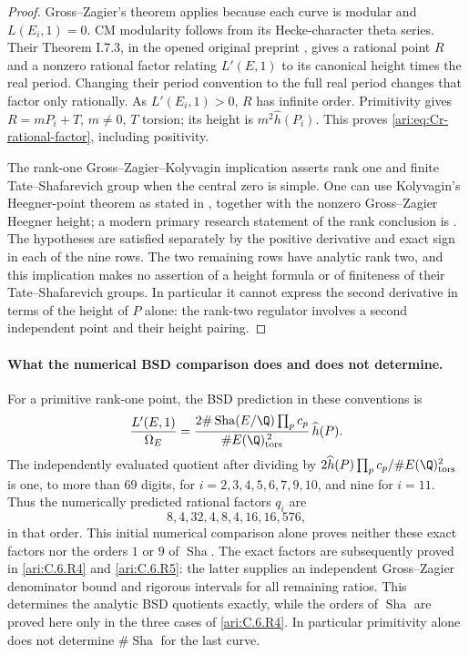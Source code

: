 \begin{proof}
Gross--Zagier's theorem applies because each curve is modular and
$L(E_i,1)=0$. CM modularity follows from its Hecke-character
theta series. Their Theorem I.7.3, in the opened original
preprint \citep{CrGrossZagier1986}, gives a rational point $R$ and
a nonzero rational factor relating $L'(E,1)$ to its canonical
height times the real period. Changing their period convention
to the full real period changes that factor only rationally.
As $L'(E_i,1)>0$, $R$ has infinite order. Primitivity gives
$R=mP_i+T$, $m\ne0$, $T$ torsion; its height is
$m^2\widehat h(P_i)$. This proves
\eqref{ari:eq:Cr-rational-factor}, including positivity.

The rank-one Gross--Zagier--Kolyvagin implication asserts rank one
and finite Tate--Shafarevich group when the central zero is simple.
One can use Kolyvagin's Heegner-point theorem as stated in
\citet[Theorem 1.3]{CrGross1991}, together with the nonzero
Gross--Zagier Heegner height; a modern primary research statement
of the rank conclusion is \citet[Theorem 1.1]{CrJetchev2008}.
The hypotheses are satisfied separately by the positive derivative
and exact sign in each of the nine rows. The two remaining rows
have analytic rank two, and this implication makes no assertion
of a height formula or of finiteness of their Tate--Shafarevich
groups. In particular it cannot express the second derivative
in terms of the height of $P$ alone: the rank-two regulator involves
a second independent point and their height pairing.
\end{proof}

\paragraph{What the numerical BSD comparison does and does not determine.}
For a primitive rank-one point, the BSD prediction in these conventions is
\[
 \frac{L'(E,1)}{\Omega_E}
 =\frac{2\#\operatorname{Sha}(E/\Q)\prod_pc_p}
        {\#E(\Q)_{\rm tors}^{\,2}}\,\widehat h(P).
\]
The independently evaluated quotient after dividing by
$2\widehat h(P)\prod_pc_p/\#E(\Q)_{\rm tors}^2$ is one, to
more than 69 digits, for $i=2,3,4,5,6,7,9,10$, and nine for
$i=11$. Thus the numerically predicted rational factors $q_i$ are
\[
 8,4,32,4,8,4,16,16,576,
\]
in that order. This initial numerical comparison alone proves neither
these exact factors nor the orders $1$ or $9$ of $\operatorname{Sha}$.
The exact factors are subsequently proved in \ref{ari:C.6.R4} and \ref{ari:C.6.R5}:
the latter supplies an independent Gross--Zagier denominator bound
and rigorous intervals for all remaining ratios. This determines
the analytic BSD quotients exactly, while the orders of
$\operatorname{Sha}$ are proved here only in the three cases of
\ref{ari:C.6.R4}. In particular primitivity alone does not determine
$\#\operatorname{Sha}$ for the last curve.


